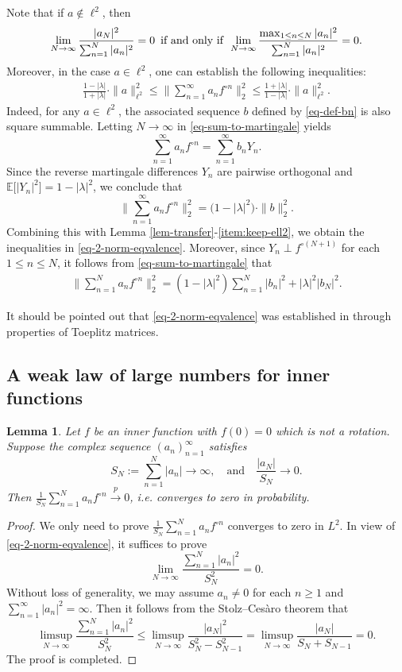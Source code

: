 \documentclass[11pt, reqno]{amsart}
\newtheorem{lemma}[theorem]{Lemma}
\theoremstyle{definition}
\newtheorem*{Brown-Eagleson Theorem}{The Brown-Eagleson Theorem}
\newcommand{\E}{\mathbb E}
\begin{document}
	Note that if $a\notin \ell^2$, then $$\lim_{N\to \infty} \frac{|a_N|^2}{\sum_{n=1}^N |a_n|^2}=0 \text{\, if and only if \,}\lim_{N\to \infty} \frac{\max_{1\leq n\leq N}|a_n|^2}{\sum_{n=1}^N |a_n|^2}=0.$$ Moreover, in the case $a\in \ell^2$, one can establish the following inequalities:
	\begin{align}\label{eq-2-norm-eqvalence}
		\frac{1-|\lambda|}{1+|\lambda|} \cdot \|a\|^2_{\ell^2} \leq \bigg\|\sum_{n=1}^\infty a_n f^{\circ n}\bigg\|^2_2 \leq \frac{1+|\lambda|}{1-|\lambda|}\cdot \|a\|^2_{\ell^2}.
	\end{align}
	Indeed, for any $a\in \ell^2$, the associated sequence $b$ defined by \eqref{eq-def-bn} is also square summable. Letting $N\to \infty$ in \eqref{eq-sum-to-martingale} yields $$\sum_{n=1}^\infty a_n f^{\circ n} = \sum_{n=1}^\infty b_n Y_n.$$ Since the reverse martingale differences $Y_n$ are pairwise orthogonal and $\E\big[ |Y_n|^2\big] = 1-|\lambda|^2$, we conclude that $$\bigg\|\sum_{n=1}^\infty a_n f^{\circ n}\bigg\|^2_2 = \big( 1- |\lambda|^2\big) \cdot \|b\|^2_2.$$ Combining this with Lemma \ref{lem-transfer}-\ref{item:keep-ell2}, we obtain the inequalities in \eqref{eq-2-norm-eqvalence}. Moreover, since $Y_n \perp f^{\circ (N+1)}$ for each $1\leq n \leq N$, it follows from \eqref{eq-sum-to-martingale} that 
	\begin{align}\label{eq-rhoN-sigmaN} 
		\bigg\|\sum_{n=1}^N a_n f^{\circ n}\bigg\|^2_2 = (1-|\lambda|^2)\sum_{n=1}^N |b_n|^2  + |\lambda|^2 |b_N|^2.
	\end{align}
	
	It should be pointed out that \eqref{eq-2-norm-eqvalence} was established in \cite[Theorem 9]{NS22} through properties of Toeplitz matrices. 
	
	\subsection{A weak law of large numbers for inner functions}

	\begin{lemma}\label{lem-weak-law}
		Let $f$ be an inner function with $f(0)=0$ which is not a rotation. Suppose the complex sequence $(a_n)_{n=1}^\infty$ satisfies $$ S_N:=\sum_{n=1}^N |a_n| \to \infty, \quad \text{and}\quad  \frac{|a_N|}{S_N}\to 0.$$ Then $\frac{1}{S_N} \sum_{n=1}^N a_n f^{\circ n} \stackrel{p}{\longrightarrow} 0$, i.e.  converges to zero in probability. 
	\end{lemma}
	\begin{proof} 
		We only need to prove $\frac{1}{S_N} \sum_{n=1}^N a_n f^{\circ n}$ converges to zero in $L^2$. In view of \eqref{eq-2-norm-eqvalence}, it suffices to prove $$\lim_{N\to \infty} \frac{\sum_{n=1}^N |a_n|^2}{S^2_N}=0.$$ Without loss of generality, we may assume $a_n\neq 0$ for each $n\geq 1$ and $\sum_{n=1}^\infty |a_n|^2 = \infty$. Then it follows from the Stolz--Ces\`aro theorem that $$\limsup_{N\to \infty} \frac{\sum_{n=1}^N |a_n|^2}{S^2_N} \leq  \limsup_{N\to \infty} \frac{|a_N|^2}{S_N^2-S^2_{N-1}}= \limsup_{N\to \infty}\frac{|a_N|}{ S_N+S_{N-1}}=0.$$
		The proof is completed. 
	\end{proof}
\end{document}
